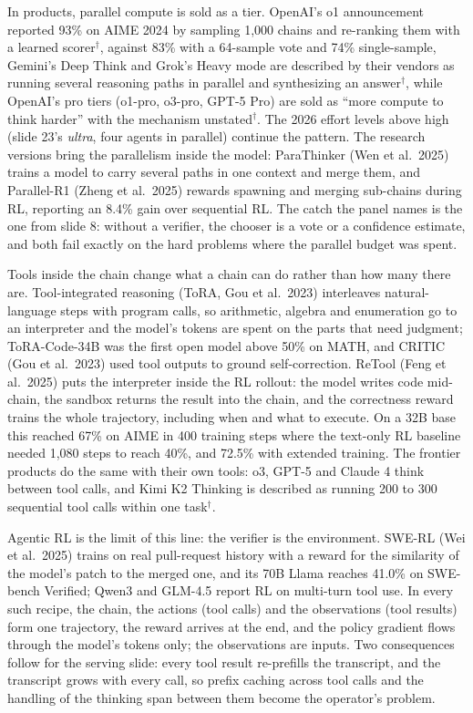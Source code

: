 \documentclass[11pt,letterpaper]{article}
\begin{document}
In products, parallel compute is sold as a tier. OpenAI's o1 announcement reported 93\% on AIME 2024 by sampling 1,000 chains and re-ranking them with a learned scorer$^\dagger$, against 83\% with a 64-sample vote and 74\% single-sample, Gemini's Deep Think and Grok's Heavy mode are described by their vendors as running several reasoning paths in parallel and synthesizing an answer$^\dagger$, while OpenAI's pro tiers (o1-pro, o3-pro, GPT-5 Pro) are sold as ``more compute to think harder'' with the mechanism unstated$^\dagger$. The 2026 effort levels above high (slide 23's \emph{ultra}, four agents in parallel) continue the pattern. The research versions bring the parallelism inside the model: ParaThinker (Wen et al.\ 2025) trains a model to carry several paths in one context and merge them, and Parallel-R1 (Zheng et al.\ 2025) rewards spawning and merging sub-chains during RL, reporting an 8.4\% gain over sequential RL. The catch the panel names is the one from slide 8: without a verifier, the chooser is a vote or a confidence estimate, and both fail exactly on the hard problems where the parallel budget was spent.

Tools inside the chain change what a chain can do rather than how many there are. Tool-integrated reasoning (ToRA, Gou et al.\ 2023) interleaves natural-language steps with program calls, so arithmetic, algebra and enumeration go to an interpreter and the model's tokens are spent on the parts that need judgment; ToRA-Code-34B was the first open model above 50\% on MATH, and CRITIC (Gou et al.\ 2023) used tool outputs to ground self-correction. ReTool (Feng et al.\ 2025) puts the interpreter inside the RL rollout: the model writes code mid-chain, the sandbox returns the result into the chain, and the correctness reward trains the whole trajectory, including when and what to execute. On a 32B base this reached 67\% on AIME in 400 training steps where the text-only RL baseline needed 1,080 steps to reach 40\%, and 72.5\% with extended training. The frontier products do the same with their own tools: o3, GPT-5 and Claude 4 think between tool calls, and Kimi K2 Thinking is described as running 200 to 300 sequential tool calls within one task$^\dagger$.

Agentic RL is the limit of this line: the verifier is the environment. SWE-RL (Wei et al.\ 2025) trains on real pull-request history with a reward for the similarity of the model's patch to the merged one, and its 70B Llama reaches 41.0\% on SWE-bench Verified; Qwen3 and GLM-4.5 report RL on multi-turn tool use. In every such recipe, the chain, the actions (tool calls) and the observations (tool results) form one trajectory, the reward arrives at the end, and the policy gradient flows through the model's tokens only; the observations are inputs. Two consequences follow for the serving slide: every tool result re-prefills the transcript, and the transcript grows with every call, so prefix caching across tool calls and the handling of the thinking span between them become the operator's problem.
\end{document}
